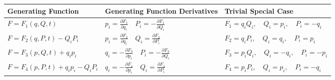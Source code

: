 	\begin{table}[H]
	\centering
	\renewcommand*{\arraystretch}{1.8}
	\begin{tabular}{|p{4.5cm}|p{5cm}|p{5.5cm}|}	
	\hline Generating Function&Generating Function Derivatives&Trivial Special Case\\
	\hline $F=F_{1}(q, Q, t)$&$p_{i}=\frac{\partial F_{1}}{\partial q_{i}} \quad P_{i}=-\frac{\partial F_{1}}{\partial Q_{i}}$&$F_{1}=q_{i} Q_{i}, \quad Q_{i}=p_{i}, \quad P_{i}=-q_{i}$\\
	\hline $F=F_{2}(q, P, t)-Q_{i} P_{i}$&$p_{i}=\frac{\partial F_{2}}{\partial q_{i}} \quad Q_{i}=\frac{\partial F_{2}}{\partial P_{i}}$&$F_{2}=q_{i} P_{i}, \quad Q_{i}=q_{i}, \quad P_{i}=p_{i}$\\
	\hline $F=F_{3}(p, Q, t)+q_{i} p_{i}$&$q_{i}=-\frac{\partial F_{3}}{\partial p_{i}} \quad P_{i}=-\frac{\partial F_{3}}{\partial Q_{i}}$&$F_{3}=p_{i} Q_{i}, \quad Q_{i}=-q_{i}, \quad P_{i}=-p_{i}$\\
	\hline $F=F_{4}(p, P, t)+q_{i} p_{i}-Q_{i} P_{i}$&$q_{i}=-\frac{\partial F_{4}}{\partial p_{i}} \quad Q_{i}=\frac{\partial F_{4}}{\partial P_{i}}$&$F_{4}=p_{i} P_{i}, \quad Q_{i}=p_{i}, \quad P_{i}=-q_{i}$\\\hline
	\end{tabular}
\end{table}
